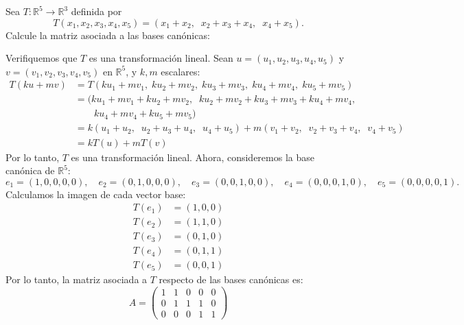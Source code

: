 \begin{center}
\end{center}
\begin{example}\label{ejmntl}
Sea $T: \mathbb{R}^5 \to \mathbb{R}^3$ definida por
\[
T(x_1, x_2, x_3, x_4, x_5) = (x_1 + x_2,\;\; x_2 + x_3 + x_4,\;\; x_4 + x_5).
\] Calcule la matriz asociada a las bases canónicas:
\begin{myproof}
Verifiquemos que $T$ es una transformación lineal. Sean $u = (u_1, u_2, u_3, u_4, u_5)$ y $v = (v_1, v_2, v_3, v_4, v_5)$ en $\mathbb{R}^5$, y $k, m$ escalares:
\begin{align*}
T(k u + m v) &= T(k u_1 + m v_1,\; k u_2 + m v_2,\; k u_3 + m v_3,\; k u_4 + m v_4,\; k u_5 + m v_5) \\
&= (k u_1 + m v_1 + k u_2 + m v_2,\;\; k u_2 + m v_2 + k u_3 + m v_3 + k u_4 + m v_4, \\
&\qquad k u_4 + m v_4 + k u_5 + m v_5) \\
&= k (u_1 + u_2,\;\; u_2 + u_3 + u_4,\;\; u_4 + u_5) + m (v_1 + v_2,\;\; v_2 + v_3 + v_4,\;\; v_4 + v_5) \\
&= k T(u) + m T(v)
\end{align*}
Por lo tanto, $T$ es una transformación lineal. Ahora, consideremos la base canónica de $\mathbb{R}^5$:
\[
e_1 = (1,0,0,0,0),\quad e_2 = (0,1,0,0,0),\quad e_3 = (0,0,1,0,0),\quad e_4 = (0,0,0,1,0),\quad e_5 = (0,0,0,0,1).
\]
Calculamos la imagen de cada vector base:
\begin{align*}
T(e_1) &= (1,0,0) \\
T(e_2) &= (1,1,0) \\
T(e_3) &= (0,1,0) \\
T(e_4) &= (0,1,1) \\
T(e_5) &= (0,0,1)
\end{align*}
Por lo tanto, la matriz asociada a $T$ respecto de las bases canónicas es:
\[
A = \begin{pmatrix}
1 & 1 & 0 & 0 & 0 \\
0 & 1 & 1 & 1 & 0 \\
0 & 0 & 0 & 1 & 1
\end{pmatrix}
\]
\end{myproof}
\end{example}

